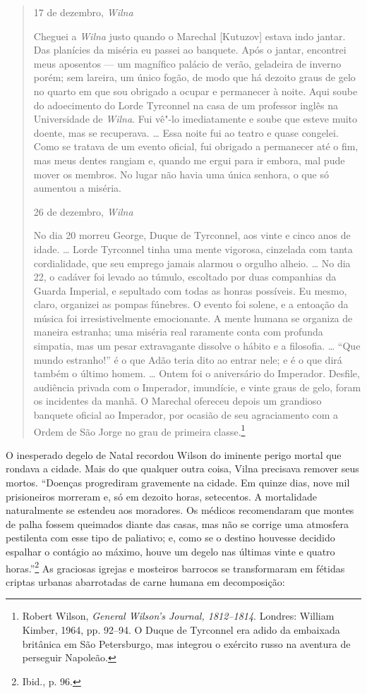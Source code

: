 \begin{quote}
17 de dezembro, \textit{Wilna}

Cheguei a \textit{Wilna} justo quando o Marechal {[}Kutuzov{]} estava indo
jantar. Das planícies da miséria eu passei ao banquete. Após o jantar,
encontrei meus aposentos --- um magnífico palácio de verão, geladeira de
inverno porém; sem lareira, um único fogão, de modo que há dezoito graus
de gelo no quarto em que sou obrigado a ocupar e permanecer à noite.
Aqui soube do adoecimento do Lorde Tyrconnel na casa de um professor
inglês na Universidade de \textit{Wilna}. Fui vê"-lo imediatamente e soube que
esteve muito doente, mas se recuperava. \ldots{} Essa noite fui ao
teatro e quase congelei. Como se tratava de um evento oficial, fui
obrigado a permanecer até o fim, mas meus dentes rangiam e, quando me
ergui para ir embora, mal pude mover os membros. No lugar não havia uma
única senhora, o que só aumentou a miséria.

26 de dezembro, \textit{Wilna}

No dia 20 morreu George, Duque de Tyrconnel, aos vinte e cinco anos de
idade. \ldots{} Lorde Tyrconnel tinha uma mente vigorosa, cinzelada com
tanta cordialidade, que seu emprego jamais alarmou o orgulho alheio.
\ldots{} No dia 22, o cadáver foi levado ao túmulo, escoltado por duas
companhias da Guarda Imperial, e sepultado com todas as honras
possíveis. Eu mesmo, claro, organizei as pompas fúnebres. O evento foi
solene, e a entoação da música foi irresistivelmente emocionante. A
mente humana se organiza de maneira estranha; uma miséria real raramente
conta com profunda simpatia, mas um pesar extravagante dissolve o hábito
e a filosofia. \ldots{} ``Que mundo estranho!'' é o que Adão teria dito
ao entrar nele; e é o que dirá também o último homem. \ldots{} Ontem foi
o aniversário do Imperador. Desfile, audiência privada com o Imperador,
imundície, e vinte graus de gelo, foram os incidentes da manhã. O
Marechal ofereceu depois um grandioso banquete oficial ao Imperador, por
ocasião de seu agraciamento com a Ordem de São Jorge no grau de primeira
classe.\footnote{Robert Wilson, \textit{General Wilson's Journal, 1812--1814}. Londres: William Kimber, 1964, pp. 92--94. O Duque de Tyrconnel era adido da embaixada britânica em São Petersburgo, mas integrou o exército russo na aventura de perseguir Napoleão.} 
\end{quote}

O inesperado degelo de Natal recordou Wilson do iminente perigo mortal
que rondava a cidade. Mais do que qualquer outra coisa, Vilna precisava
remover seus mortos. ``Doenças progrediram gravemente na cidade. Em
quinze dias, nove mil prisioneiros morreram e, só em dezoito horas,
setecentos. A mortalidade naturalmente se estendeu aos moradores. Os
médicos recomendaram que montes de palha fossem queimados diante das
casas, mas não se corrige uma atmosfera pestilenta com esse tipo de
paliativo; e, como se o destino houvesse decidido espalhar o contágio ao
máximo, houve um degelo nas últimas vinte e quatro horas.''\footnote{Ibid., p. 96.} As graciosas igrejas e mosteiros barrocos se transformaram em
fétidas criptas urbanas abarrotadas de carne humana em decomposição:

